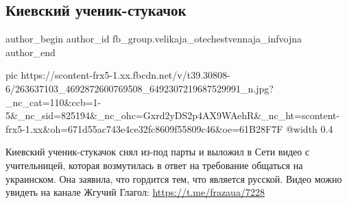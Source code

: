  
 
 
 
 
 
\subsection{Киевский ученик-стукачок}
\label{sec:04_12_2021.fb.fb_group.velikaja_otechestvennaja_infvojna.1.kiev_uchenik_stukach}
 
\ifcmt
 author_begin
   author_id fb_group.velikaja_otechestvennaja_infvojna
 author_end
\fi

\ifcmt
  pic https://scontent-frx5-1.xx.fbcdn.net/v/t39.30808-6/263637103_4692872600769508_6492307219687529991_n.jpg?_nc_cat=110&ccb=1-5&_nc_sid=825194&_nc_ohc=Gxrd2yDS2p4AX9WAehR&_nc_ht=scontent-frx5-1.xx&oh=671d55ac743e4ce32fc8609f55809c46&oe=61B28F7F
  @width 0.4
\fi

Киевский ученик-стукачок снял из-под парты и выложил в Сети видео с
учительницей, которая возмутилась в ответ на требование общаться на украинском.
Она заявила, что гордится тем, что является русской. Видео можно увидеть на
канале Жгучий Глагол: \url{https://t.me/frazaua/7228}

